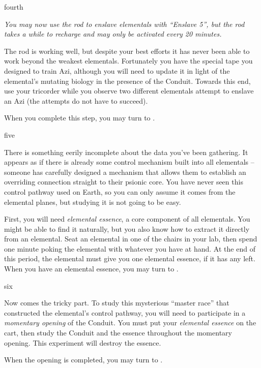 \documentclass[notebook]{elementals}
\begin{document}
\begin{page}{fourth}

\emph{You may now use the rod to enslave elementals with ``Enslave 5'', but the rod takes a while to recharge and may only be activated every 20 minutes.}

The rod is working well, but despite your best efforts it has never been able to work beyond the weakest elementals. Fortunately you have the special tape you designed to train Azi, although you will need to update it in light of the elemental's mutating biology in the presence of the Conduit. Towards this end, use your tricorder while you observe two different elementals attempt to enslave an Azi (the attempts do not have to succeed).

When you complete this step, you may turn to .

\end{page}

\begin{page}{five}

There is something eerily incomplete about the data you've been gathering. It appears as if there is already some control mechanism built into all elementals -- someone has carefully designed a mechanism that allows them to establish an overriding connection straight to their psionic core. You have never seen this control pathway used on Earth, so you can only assume it comes from the elemental planes, but studying it is not going to be easy.

First, you will need \emph{elemental essence}, a core component of all elementals. You might be able to find it naturally, but you also know how to extract it directly from an elemental. Seat an elemental in one of the chairs in your lab, then spend one minute poking the elemental with whatever you have at hand. At the end of this period, the elemental must give you one elemental essence, if it has any left. When you have an elemental essence, you may turn to .

\end{page}

\begin{page}{six}

Now comes the tricky part. To study this mysterious ``master race'' that constructed the elemental's control pathway, you will need to participate in a \emph{momentary opening} of the Conduit. You must put your \emph{elemental essence} on the cart, then study the Conduit and the essence throughout the momentary opening. This experiment will destroy the essence.

When the opening is completed, you may turn to .

\end{page}
\end{document}
